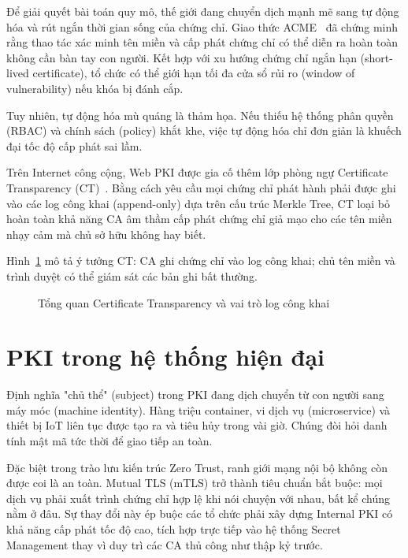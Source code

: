 Để giải quyết bài toán quy mô, thế giới đang chuyển dịch mạnh mẽ sang tự động hóa và rút ngắn thời gian sống của chứng chỉ. Giao thức ACME~\cite{RFC8555} đã chứng minh rằng thao tác xác minh tên miền và cấp phát chứng chỉ có thể diễn ra hoàn toàn không cần bàn tay con người. Kết hợp với xu hướng chứng chỉ ngắn hạn (short-lived certificate), tổ chức có thể giới hạn tối đa cửa sổ rủi ro (window of vulnerability) nếu khóa bị đánh cắp.

Tuy nhiên, tự động hóa mù quáng là thảm họa. Nếu thiếu hệ thống phân quyền (RBAC) và chính sách (policy) khắt khe, việc tự động hóa chỉ đơn giản là khuếch đại tốc độ cấp phát sai lầm.

Trên Internet công cộng, Web PKI được gia cố thêm lớp phòng ngự Certificate Transparency (CT)~\cite{RFC9162}. Bằng cách yêu cầu mọi chứng chỉ phát hành phải được ghi vào các log công khai (append-only) dựa trên cấu trúc Merkle Tree, CT loại bỏ hoàn toàn khả năng CA âm thầm cấp phát chứng chỉ giả mạo cho các tên miền nhạy cảm mà chủ sở hữu không hay biết.

Hình~\ref{fig:ct-overview} mô tả ý tưởng CT: CA ghi chứng chỉ vào log công khai; chủ tên miền và trình duyệt có thể giám sát các bản ghi bất thường.

\begin{figure}[htbp]
    \centering
    \caption{Tổng quan Certificate Transparency và vai trò log công khai}
    \label{fig:ct-overview}
\end{figure}

\section{PKI trong hệ thống hiện đại}
\label{sec:7.3}

Định nghĩa "chủ thể" (subject) trong PKI đang dịch chuyển từ con người sang máy móc (machine identity). Hàng triệu container, vi dịch vụ (microservice) và thiết bị IoT liên tục được tạo ra và tiêu hủy trong vài giờ. Chúng đòi hỏi danh tính mật mã tức thời để giao tiếp an toàn.

Đặc biệt trong trào lưu kiến trúc Zero Trust, ranh giới mạng nội bộ không còn được coi là an toàn. Mutual TLS (mTLS) trở thành tiêu chuẩn bắt buộc: mọi dịch vụ phải xuất trình chứng chỉ hợp lệ khi nói chuyện với nhau, bất kể chúng nằm ở đâu. Sự thay đổi này ép buộc các tổ chức phải xây dựng Internal PKI có khả năng cấp phát tốc độ cao, tích hợp trực tiếp vào hệ thống Secret Management thay vì duy trì các CA thủ công như thập kỷ trước.

